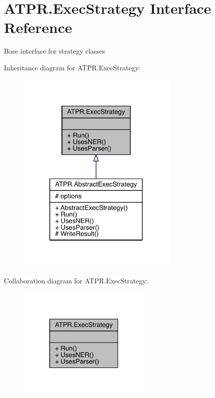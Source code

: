 \hypertarget{interface_a_t_p_r_1_1_exec_strategy}{}\section{A\+T\+P\+R.\+Exec\+Strategy Interface Reference}
\label{interface_a_t_p_r_1_1_exec_strategy}


Base interface for strategy classes  




Inheritance diagram for A\+T\+P\+R.\+Exec\+Strategy\+:
\nopagebreak
\begin{figure}[H]
\begin{center}
\leavevmode
\includegraphics[width=221pt]{d2/d3b/interface_a_t_p_r_1_1_exec_strategy__inherit__graph}
\end{center}
\end{figure}


Collaboration diagram for A\+T\+P\+R.\+Exec\+Strategy\+:
\nopagebreak
\begin{figure}[H]
\begin{center}
\leavevmode
\includegraphics[width=184pt]{d9/db3/interface_a_t_p_r_1_1_exec_strategy__coll__graph}
\end{center}
\end{figure}
